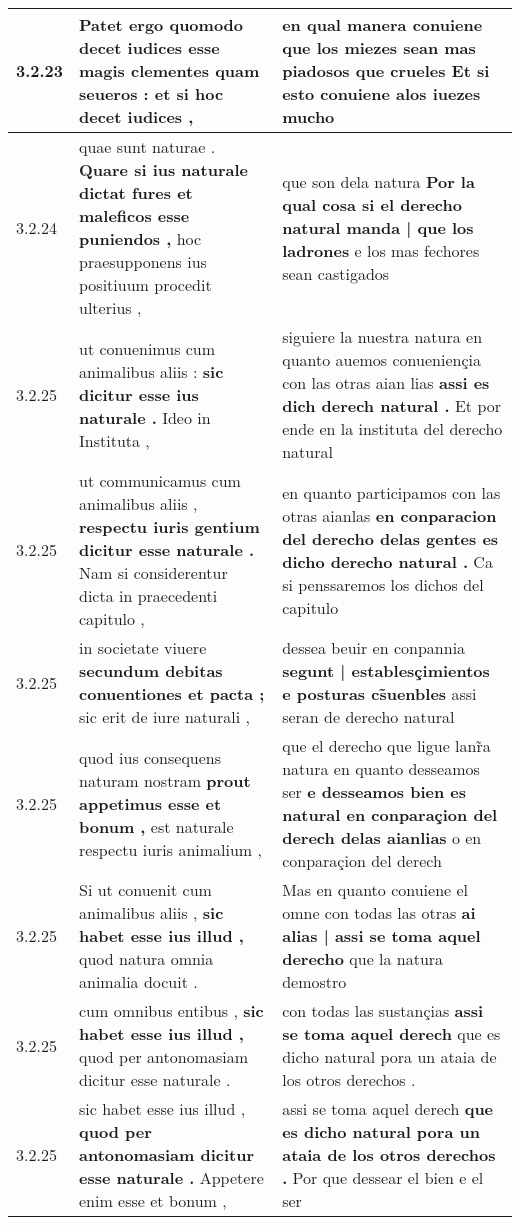 \begin{tabular}{|p{1cm}|p{6.5cm}|p{6.5cm}|}
3.2.23 & Patet ergo quomodo decet \textbf{ iudices esse magis clementes quam seueros : } et si hoc decet iudices , & en qual manera conuiene \textbf{ que los miezes sean mas piadosos que crueles } Et si esto conuiene alos iuezes mucho \\\hline
3.2.24 & quae sunt naturae . \textbf{ Quare si ius naturale dictat fures et maleficos esse puniendos , } hoc praesupponens ius positiuum procedit ulterius , & que son dela natura \textbf{ Por la qual cosa si el derecho natural manda | que los ladrones } e los mas fechores sean castigados \\\hline
3.2.25 & ut conuenimus cum animalibus aliis : \textbf{ sic dicitur esse ius naturale . } Ideo in Instituta , & siguiere la nuestra natura en quanto auemos conueniençia con las otras aian lias \textbf{ assi es dich derech natural . } Et por ende en la instituta del derecho natural \\\hline
3.2.25 & ut communicamus cum animalibus aliis , \textbf{ respectu iuris gentium dicitur esse naturale . } Nam si considerentur dicta in praecedenti capitulo , & en quanto participamos con las otras aianlas \textbf{ en conparacion del derecho delas gentes es dicho derecho natural . } Ca si penssaremos los dichos del capitulo \\\hline
3.2.25 & in societate viuere \textbf{ secundum debitas conuentiones et pacta ; } sic erit de iure naturali , & dessea beuir en conpannia \textbf{ segunt | establesçimientos e posturas cs̃uenbles } assi seran de derecho natural \\\hline
3.2.25 & quod ius consequens naturam nostram \textbf{ prout appetimus esse et bonum , } est naturale respectu iuris animalium , & que el derecho que ligue lanr̃a natura en quanto desseamos ser \textbf{ e desseamos bien es natural en conparaçion del derech delas aianlias } o en conparaçion del derech \\\hline
3.2.25 & Si ut conuenit cum animalibus aliis , \textbf{ sic habet esse ius illud , } quod natura omnia animalia docuit . & Mas en quanto conuiene el omne con todas las otras \textbf{ ai alias | assi se toma aquel derecho } que la natura demostro \\\hline
3.2.25 & cum omnibus entibus , \textbf{ sic habet esse ius illud , } quod per antonomasiam dicitur esse naturale . & con todas las sustançias \textbf{ assi se toma aquel derech } que es dicho natural pora un ataia de los otros derechos . \\\hline
3.2.25 & sic habet esse ius illud , \textbf{ quod per antonomasiam dicitur esse naturale . } Appetere enim esse et bonum , & assi se toma aquel derech \textbf{ que es dicho natural pora un ataia de los otros derechos . } Por que dessear el bien e el ser \\\hline

\end{tabular}
